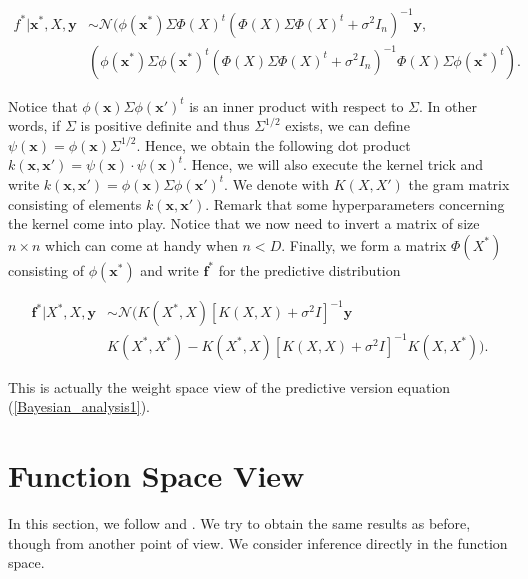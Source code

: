 \documentclass[12pt,a4paper,oneside]{book}
\begin{document}
\begin{align}
f^{\ast}|\bm{x}^{\ast},X,\bm{y} &\sim \mathcal{N} ( \phi\left(\bm{x}^{\ast}\right) \Sigma \Phi(X)^t  (\Phi(X) \Sigma \Phi(X)^t + \sigma^2 I_n)^{-1} \bm{y}, \nonumber \\
& (\phi (\bm{x}^{\ast} )\Sigma \phi\left(\bm{x}^{\ast}\right)^t (\Phi(X) \Sigma \Phi(X)^t + \sigma^2 I_n)^{-1}  \Phi(X) \Sigma \phi\left(\bm{x}^{\ast}\right)^t ).
\end{align} 

Notice that $\phi\left(\bm{x}\right) \Sigma \phi \left(\bm{x}'\right)^t$ is an inner product with respect to $\Sigma$. In other words, if $\Sigma$ is positive definite and thus $\Sigma^{1/2}$ exists, we can define $\psi(\bm{x}) = \phi\left(\bm{x}\right) \Sigma^{1/2} $. Hence, we obtain the following dot product $k(\bm{x},\bm{x}') = \psi(\bm{x}) \cdot \psi(\bm{x})^t$. Hence, we will also execute the kernel trick and write $k(\bm{x},\bm{x}') = \phi\left(\bm{x}\right) \Sigma \phi \left(\bm{x}'\right)^t$. We denote with $K(X,X')$ the gram matrix consisting of elements $k(\bm{x},\bm{x}')$. Remark that some hyperparameters concerning the kernel come into play. Notice that we now need to invert a matrix of size $n \times n$ which can come at handy when $n < D$. Finally, we form a matrix $\Phi(X^{\ast})$ consisting of $\phi(\bm{x}^{\ast})$ and write $\bm{f^{\ast}}$ for the predictive distribution 

\begin{equation}\label{GPR_Bayesian_3}
\boxed{\begin{aligned}
\bm{f^{\ast}} | X^{\ast}, X, \bm{y} &\sim \mathcal{N} (   K(X^{\ast},X)[K(X,X) + \sigma^2 I]^{-1} \bm{y} \\  
& K(X^{\ast}, X^{\ast}) - K(X^{\ast},X)  [K(X,X) + \sigma^2 I]^{-1}  K(X,X^{\ast} )).
\end{aligned}}
\end{equation}

This is actually the weight space view of the predictive version equation (\ref{Bayesian_analysis1}).


\section{Function Space View} \label{functionspace}

In this section, we follow \cite{GPRbook} and \cite{de2018machine}. We try to obtain the same results as before, though from another point of view. We consider inference directly in the function space. 
\end{document}
